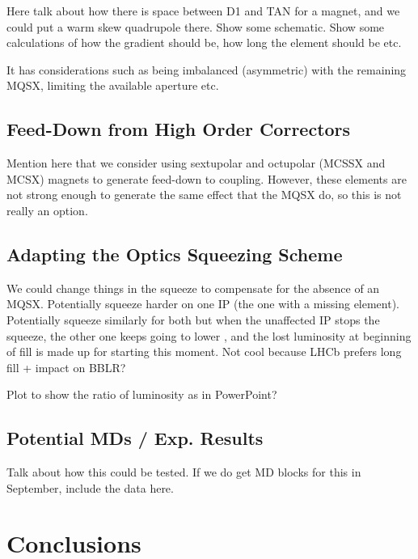 Here talk about how there is space between D1 and TAN for a magnet, and we could put a warm skew quadrupole there.
Show some schematic.
Show some calculations of how the gradient should be, how long the element should be etc.

It has considerations such as being imbalanced (asymmetric) with the remaining MQSX, limiting the available aperture etc.

\subsection{Feed-Down from High Order Correctors}

Mention here that we consider using sextupolar and octupolar (MCSSX and MCSX) magnets to generate feed-down to coupling.
However, these elements are not strong enough to generate the same effect that the MQSX do, so this is not really an option.

\subsection{Adapting the Optics Squeezing Scheme}

We could change things in the squeeze to compensate for the absence of an MQSX.
Potentially squeeze harder on one IP (the one with a missing element).
Potentially squeeze similarly for both but when the unaffected IP stops the squeeze, the other one keeps going to lower \betastar, and the lost luminosity at beginning of fill is made up for starting this moment.
Not cool because LHCb prefers long fill + impact on BBLR?

Plot to show the ratio of luminosity as in PowerPoint?

\subsection{Potential MDs / Exp. Results}

Talk about how this could be tested.
If we do get MD blocks for this in September, include the data here.


\section{Conclusions}

